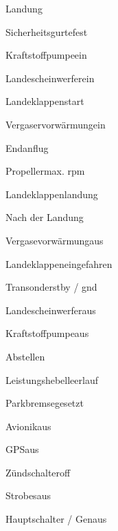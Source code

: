 \begin{task}
  \begin{checklist}{Landung}
    \item{Sicherheitsgurte}{fest}
    \item{Kraftstoffpumpe}{ein}
    \item{Landescheinwerfer}{ein}
    \item{Landeklappen}{start}
    \item{Vergaservorwärmung}{ein}
  \end{checklist}
\end{task}

\begin{task}
  \begin{checklist}{Endanflug}
    \item{Propeller}{max. rpm}
    \item{Landeklappen}{landung}
  \end{checklist}
\end{task}

\begin{task}
  \begin{checklist}{Nach der Landung}
    \item{Vergasevorwärmung}{aus}
    \item{Landeklappen}{eingefahren}
    \item{Transonder}{stby / gnd}
    \item{Landescheinwerfer}{aus}
    \item{Kraftstoffpumpe}{aus}
  \end{checklist}
\end{task}

\begin{task}
  \begin{checklist}{Abstellen}
    \item{Leistungshebel}{leerlauf}
    \item{Parkbremse}{gesetzt}
    \item{Avionik}{aus}
    \item{GPS}{aus}
    \item{Zündschalter}{off}
    \item{Strobes}{aus}
    \item{Hauptschalter / Gen}{aus}
  \end{checklist}
\end{task}

